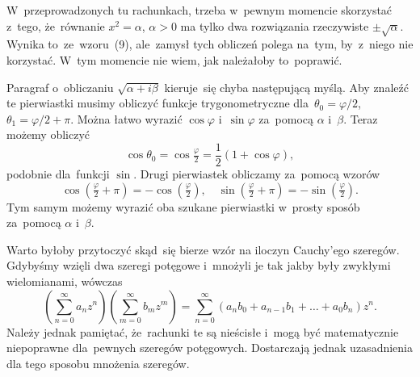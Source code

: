 \documentclass[a4paper,11pt]{article}
\begin{document}
\vspace{\spaceFour}



\start {} W~przeprowadzonych tu rachunkach, trzeba w~pewnym
momencie skorzystać z~tego, że~równanie $x^{ 2 } = \alpha$,
$\alpha > 0$ ma tylko dwa rozwiązania rzeczywiste
$\pm \sqrt{ \alpha }$. Wynika to~ze~wzoru~(9), ale~zamysł tych
obliczeń polega na~tym, by~z~niego nie korzystać. W~tym momencie nie
wiem, jak należałoby to~poprawić.

\vspace{\spaceFour}



\start {} Paragraf o~obliczaniu $\sqrt{ \alpha + i \beta }$
kieruje~się chyba następującą myślą. Aby znaleźć te pierwiastki musimy
obliczyć funkcje trygonometryczne dla~$\theta_{ 0 } = \varphi / 2$,
$\theta_{ 1 } = \varphi / 2 + \pi$. Można łatwo wyrazić $\cos \varphi$
i~$\sin \varphi$ za~pomocą $\alpha$ i~$\beta$. Teraz możemy obliczyć
\begin{equation}
  \label{eq:Leja-11}
    \cos \theta_{ 0 } = \cos \tfrac{ \varphi }{ 2 } = \frac{ 1 }{ 2 } ( 1 + \cos \varphi ),
\end{equation}
podobnie dla~funkcji $\sin$. Drugi pierwiastek obliczamy za~pomocą
wzorów
\begin{equation}
  \label{eq:Leja-12}
  \cos( \tfrac{ \varphi }{ 2 } + \pi ) = -\cos( \tfrac{ \varphi }{ 2 } ), \quad
  \sin( \tfrac{ \varphi }{ 2 } + \pi ) = -\sin( \tfrac{ \varphi }{ 2 } ).
\end{equation}
Tym samym możemy wyrazić oba szukane pierwiastki w~prosty sposób
za~pomocą $\alpha$ i~$\beta$.

\vspace{\spaceFour}



\start {} Warto byłoby przytoczyć skąd~się bierze wzór na
iloczyn Cauchy’ego szeregów. Gdybyśmy wzięli dwa szeregi potęgowe
i~mnożyli je tak jakby były zwykłymi wielomianami, wówczas
\begin{equation}
  \label{eq:Leja-13}
    \left( \sum_{ n = 0 }^{ \infty } a_{ n } z^{ n } \right) \left(
      \sum_{ m = 0 }^{ \infty } b_{ m } z^{ m } \right) = \sum_{ n = 0
    }^{ \infty } ( a_{ n } b_{ 0 } + a_{ n - 1 } b_{ 1 } + \ldots + a_{ 0
    } b_{ n } ) z^{ n }.
\end{equation}
Należy jednak pamiętać, że~rachunki te są nieścisłe i~mogą być
matematycznie niepoprawne dla~pewnych szeregów potęgowych. Dostarczają
jednak uzasadnienia dla tego sposobu mnożenia szeregów.
\end{document}
